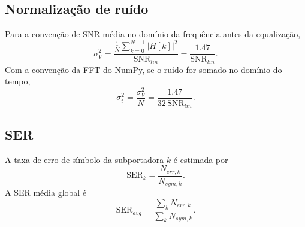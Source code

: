 \subsection{Normalização de ruído}
Para a convenção de SNR média no domínio da frequência antes da equalização,
\begin{equation}
    \sigma_V^2=\frac{\frac{1}{N}\sum_{k=0}^{N-1}|H[k]|^2}{\mathrm{SNR}_{lin}}=\frac{1.47}{\mathrm{SNR}_{lin}}.
\end{equation}
Com a convenção da FFT do NumPy, se o ruído for somado no domínio do tempo,
\begin{equation}
    \sigma_t^2=\frac{\sigma_V^2}{N}=\frac{1.47}{32\,\mathrm{SNR}_{lin}}.
\end{equation}

\subsection{SER}
A taxa de erro de símbolo da subportadora $k$ é estimada por
\begin{equation}
    \mathrm{SER}_k=\frac{N_{err,k}}{N_{sym,k}}.
\end{equation}
A SER média global é
\begin{equation}
    \mathrm{SER}_{avg}=\frac{\sum_k N_{err,k}}{\sum_k N_{sym,k}}.
\end{equation}
